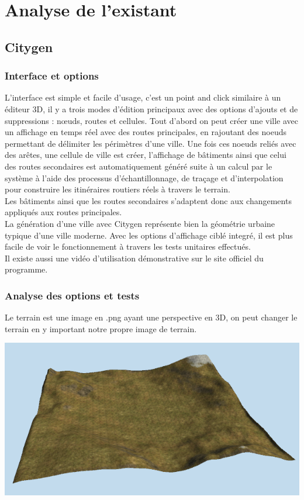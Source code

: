 \section{Analyse de l'existant}
\subsection{Citygen}
\subsubsection{Interface et options}

L’interface est simple et facile d’usage, c'est un point and click similaire à un éditeur 3D, il y a trois modes d'édition principaux avec des options d'ajouts et de suppressions : nœuds, routes et cellules. Tout d’abord on peut créer une ville avec un affichage en temps réel avec des routes principales, en rajoutant des noeuds permettant de délimiter les périmètres d'une ville. Une fois ces noeuds reliés avec des arêtes, une cellule de ville est créer, l'affichage de bâtiments ainsi que celui des routes secondaires est automatiquement généré suite à un calcul par le système à l'aide des processus d'échantillonnage, de traçage et d'interpolation pour construire les itinéraires routiers réels à travers le terrain.\\
Les bâtiments ainsi que les routes secondaires s'adaptent donc aux changements appliqués aux routes principales.\cite{KellyLog} \\

La génération d'une ville avec Citygen représente bien la géométrie urbaine typique d'une ville moderne. Avec les options d’affichage ciblé integré, il est plus facile de voir le fonctionnement à travers les tests unitaires effectués.\\

Il existe aussi une vidéo d'utilisation démonstrative sur le site officiel du programme.\cite{video}

\subsubsection{Analyse des options et tests}

Le terrain est une image en .png ayant une perspective en 3D, on peut changer le terrain en y important notre propre image de terrain.

\begin{center}
\includegraphics[height = 5 cm]{images/terrain.png}\\

\end{center}

